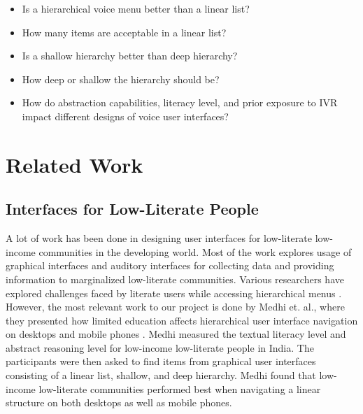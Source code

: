 \documentclass{sigchi}
\begin{document}
\begin{itemize}
\item Is a hierarchical voice menu better than a linear list?
\item How many items are acceptable in a linear list?
\item Is a shallow hierarchy better than deep hierarchy?
\item How deep or shallow the hierarchy should be?
\item How do abstraction capabilities, literacy level, and prior exposure to IVR impact different designs of voice user interfaces? 
\end{itemize}


\section{Related Work}

\subsection{Interfaces for Low-Literate People}
A lot of work has been done in designing user interfaces for low-literate low-income communities in the developing world. Most of the work explores usage of graphical interfaces \cite{Grisedale1997,Medhi2011a,Medhi2008,Ghosh2003} and auditory interfaces \cite{Cuendet2013,Agarwal2010,Mudliar2013} for collecting data and providing information to marginalized low-literate communities. Various researchers have explored challenges faced by literate users while accessing hierarchical menus \cite{Allen1983,Chaudry2012}. However, the most relevant work to our project is done by Medhi et. al., where they presented how limited education affects hierarchical user interface navigation on desktops and mobile phones \cite{Medhi2013a,Medhi2013b}. Medhi measured the textual literacy level and abstract reasoning level for low-income low-literate people in India. The participants were then asked to find items from graphical user interfaces consisting of a linear list, shallow, and deep hierarchy. Medhi found that low-income low-literate communities performed best when navigating a linear structure on both desktops as well as mobile phones.
\end{document}
